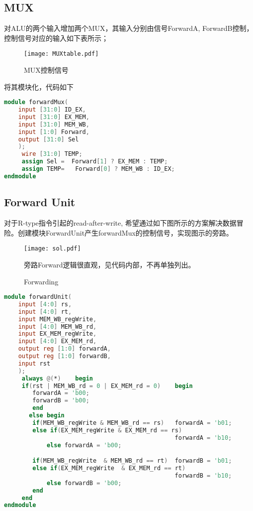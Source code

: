 \documentclass[a4paper]{article}
\begin{document}
  \subsection{MUX}
  对ALU的两个输入增加两个MUX，其输入分别由信号ForwardA, ForwardB控制，控制信号对应的输入如下表所示；
\begin{figure}[h]
  \centering
  \texttt{[image: MUXtable.pdf]}
  \caption{MUX控制信号}
\end{figure}
将其模块化，代码如下
\begin{lstlisting}[language={Verilog},title={forwardMUX.v}]
module forwardMux(
    input [31:0] ID_EX,
    input [31:0] EX_MEM,
    input [31:0] MEM_WB,
    input [1:0] Forward,
    output [31:0] Sel
    );
	 wire [31:0] TEMP;
	 assign Sel =  Forward[1] ? EX_MEM : TEMP;
	 assign TEMP=	Forward[0] ? MEM_WB : ID_EX;
endmodule  \end{lstlisting}
    \subsection{Forward Unit}
    对于R-type指令引起的read-after-write, 希望通过如下图所示的方案解决数据冒险。创建模块ForwardUnit产生forwardMux的控制信号，实现图示的旁路。
    \begin{figure}[h]
  \centering
  \texttt{[image: sol.pdf]}
  \caption{Forwarding}
  旁路Forward逻辑很直观，见代码内部，不再单独列出。
\end{figure}
    \begin{lstlisting}[language={Verilog},title={forwardUnit.v}]
module forwardUnit(
    input [4:0] rs,
    input [4:0] rt,
    input MEM_WB_regWrite,
    input [4:0] MEM_WB_rd,
    input EX_MEM_regWrite,
    input [4:0] EX_MEM_rd,
    output reg [1:0] forwardA,
    output reg [1:0] forwardB,
	input rst
    );
	 always @(*)	begin
	 if(rst | MEM_WB_rd = 0 | EX_MEM_rd = 0)	begin
		forwardA = 'b00;
		forwardB = 'b00;
		end
	   else	begin
		if(MEM_WB_regWrite & MEM_WB_rd == rs)  	forwardA = 'b01;
		else if(EX_MEM_regWrite & EX_MEM_rd == rs)
                                                forwardA = 'b10;
			else forwardA = 'b00;

		if(MEM_WB_regWrite  & MEM_WB_rd == rt)	forwardB = 'b01;
		else if(EX_MEM_regWrite  & EX_MEM_rd == rt)
                                                forwardB = 'b10;
			else forwardB = 'b00;
		end
	 end
endmodule  \end{lstlisting}
\end{document}
